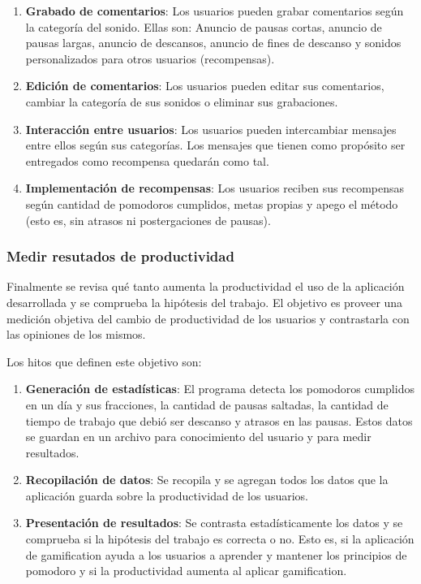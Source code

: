 \documentclass[12pt,letterpaper]{report}
\providecommand{\tightlist}{%
  \setlength{\itemsep}{0pt}\setlength{\parskip}{0pt}}
\begin{document}
\begin{enumerate}\tightlist{}
  \item \textbf{Grabado de comentarios}: Los usuarios pueden grabar
comentarios según la categoría del sonido. Ellas son: Anuncio de
pausas cortas, anuncio de pausas largas, anuncio de descansos, anuncio
de fines de descanso y sonidos personalizados para otros usuarios
(recompensas).
  \item \textbf{Edición de comentarios}: Los usuarios pueden editar
sus comentarios, cambiar la categoría de sus sonidos o eliminar sus
grabaciones.
  \item \textbf{Interacción entre usuarios}: Los usuarios pueden
intercambiar mensajes entre ellos según sus categorías.  Los mensajes
que tienen como propósito ser entregados como recompensa quedarán como
tal.
  \item \textbf{Implementación de recompensas}: Los usuarios reciben
sus recompensas según cantidad de pomodoros cumplidos, metas propias y
apego el método (esto es, sin atrasos ni postergaciones de pausas).
\end{enumerate}

\subsubsection{Medir resutados de productividad}\label{medir-resultados-de-productividad}

Finalmente se revisa qué tanto aumenta la productividad el uso de la
aplicación desarrollada y se comprueba la hipótesis del trabajo. El
objetivo es proveer una medición objetiva del cambio de productividad
de los usuarios y contrastarla con las opiniones de los mismos.

Los hitos que definen este objetivo son:

\begin{enumerate}\tightlist{}
  \item \textbf{Generación de estadísticas}: El programa detecta los
pomodoros cumplidos en un día y sus fracciones, la cantidad de pausas
saltadas, la cantidad de tiempo de trabajo que debió ser descanso y
atrasos en las pausas. Estos datos se guardan en un archivo para
conocimiento del usuario y para medir resultados.
  \item \textbf{Recopilación de datos}: Se recopila y se agregan todos
los datos que la aplicación guarda sobre la productividad de los
usuarios.
  \item \textbf{Presentación de resultados}: Se contrasta
estadísticamente los datos y se comprueba si la hipótesis del trabajo
es correcta o no. Esto es, si la aplicación de gamification ayuda a
los usuarios a aprender y mantener los principios de pomodoro y si la
productividad aumenta al aplicar gamification.
\end{enumerate}
\end{document}
